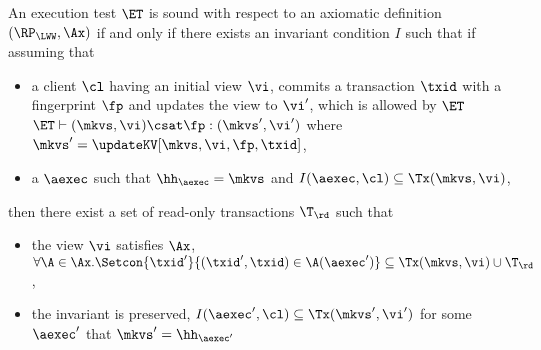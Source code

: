 \begin{definition}
\label{def:et_sound}
An execution test $\ET$ is sound with respect to an axiomatic 
definition $(\RP_{\LWW}, \Ax)$ if and only if
there exists an invariant condition $I$ such that 
if assuming that
\begin{itemize}
    \item a client \( \cl \) having an initial view \( \vi \), 
        commits a transaction \( \txid \) with a fingerprint \( \fp \) and updates the view to \( \vi' \), 
        which is allowed by \( \ET \) \ie $\ET \vdash (\mkvs, \vi) \csat \fp: (\mkvs',\vi')$ where \( \mkvs' = \updateKV[\mkvs, \vi ,\fp, \txid]\),
    \item a $\aexec$ such that $\hh_{\aexec} = \mkvs$ and $I(\aexec, \cl) \subseteq \Tx(\mkvs, \vi)$,
\end{itemize}
then there exist a set of read-only transactions $\T_{\rd}$ such that 
\begin{itemize}
\item the view \( \vi \) satisfies \( \Ax \), \ie $\forall \A \in \Ax. \Setcon{\txid' }{ (\txid', \txid) \in \A(\aexec')} \subseteq \Tx(\mkvs, \vi) \cup \T_{\rd}$, 
\item the invariant is preserved, \ie $I(\aexec', \cl) \subseteq \Tx(\mkvs', \vi')$ for some \( \aexec' \) that \( \mkvs' = \hh_{\aexec'}\)
\end{itemize}
\end{definition}

